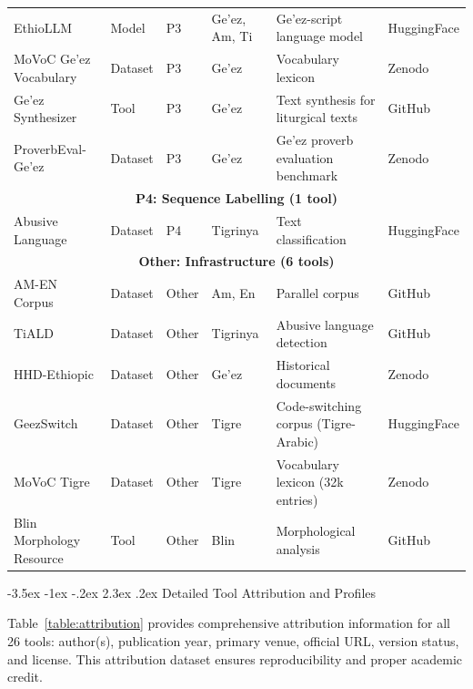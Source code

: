 \documentclass[12pt,a4paper]{article}
\makeatletter
\theoremstyle{plain}
\theoremstyle{definition}
\renewcommand{\section}{\@startsection{section}{1}{\z@}%
  {-3.5ex \@plus -1ex \@minus -.2ex}%
  {2.3ex \@plus.2ex}%
  {\large\bfseries\color{NavyBlue}}}
\makeatother
\begin{document}
\begin{table}[ht]
\begin{tabularx}{\textwidth}{|l|l|l|p{2cm}|p{2.5cm}|l|}
EthioLLM & Model & P3 & Ge'ez, Am, Ti & Ge'ez-script language model & HuggingFace \\
MoVoC Ge'ez Vocabulary & Dataset & P3 & Ge'ez & Vocabulary lexicon & Zenodo \\
Ge'ez Synthesizer & Tool & P3 & Ge'ez & Text synthesis for liturgical texts & GitHub \\
ProverbEval-Ge'ez & Dataset & P3 & Ge'ez & Ge'ez proverb evaluation benchmark & Zenodo \\
\hline
\multicolumn{6}{|c|}{\textbf{P4: Sequence Labelling (1 tool)}} \\
\hline
Abusive Language & Dataset & P4 & Tigrinya & Text classification & HuggingFace \\
\hline
\multicolumn{6}{|c|}{\textbf{Other: Infrastructure (6 tools)}} \\
\hline
AM-EN Corpus & Dataset & Other & Am, En & Parallel corpus & GitHub \\
TiALD & Dataset & Other & Tigrinya & Abusive language detection & GitHub \\
HHD-Ethiopic & Dataset & Other & Ge'ez & Historical documents & Zenodo \\
GeezSwitch & Dataset & Other & Tigre & Code-switching corpus (Tigre-Arabic) & HuggingFace \\
MoVoC Tigre & Dataset & Other & Tigre & Vocabulary lexicon (32k entries) & Zenodo \\
Blin Morphology Resource & Tool & Other & Blin & Morphological analysis & GitHub \\
\hline
\end{tabularx}
\end{table}


\section{Detailed Tool Attribution and Profiles}

Table~\ref{table:attribution} provides comprehensive attribution information for all 26 tools: author(s), publication year, primary venue, official URL, version status, and license. This attribution dataset ensures reproducibility and proper academic credit.
\end{document}
